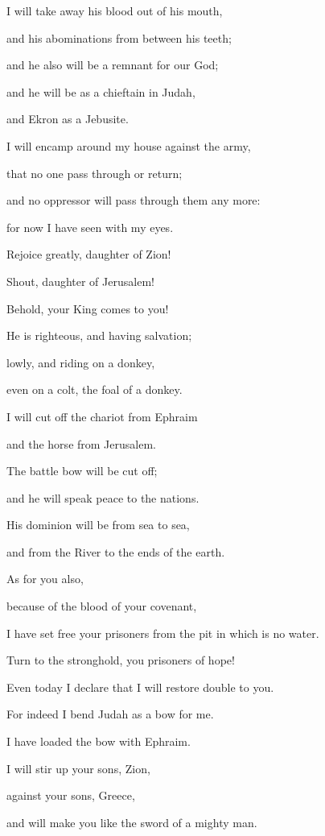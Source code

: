 \myverse{}I will take away his blood out of his mouth,

and his abominations from between his teeth;

and he also will be a remnant for our God;

and he will be as a chieftain in Judah,

and Ekron as a Jebusite.

\myverse{}I will encamp around my house against the army,

that no one pass through or return;

and no oppressor will pass through them any more:

for now I have seen with my eyes.


\vspace{\baselineskip} \myverse{}Rejoice greatly, daughter of Zion!

Shout, daughter of Jerusalem!

Behold, your King comes to you!

He is righteous, and having salvation;

lowly, and riding on a donkey,

even on a colt, the foal of a donkey.

\myverse{}I will cut off the chariot from Ephraim

and the horse from Jerusalem.

The battle bow will be cut off;

and he will speak peace to the nations.

His dominion will be from sea to sea,

and from the River to the ends of the earth.


\vspace{\baselineskip} \myverse{}As for you also,

because of the blood of your covenant,

I have set free your prisoners from the pit in which is no water.

\myverse{}Turn to the stronghold, you prisoners of hope!

Even today I declare that I will restore double to you.

\myverse{}For indeed I bend Judah as a bow for me.

I have loaded the bow with Ephraim.

I will stir up your sons, Zion,

against your sons, Greece,

and will make you like the sword of a mighty man.


